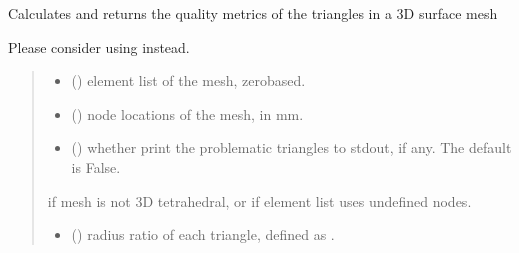 \documentclass[letterpaper,10pt,english]{sphinxmanual}
\begin{document}
\begin{fulllineitems}
\label{\detokenize{_autosummary/nirfasterff.meshing.meshutils.checkmesh3d_surface:nirfasterff.meshing.meshutils.checkmesh3d_surface}}
\pysigstartsignatures
{}
\pysigstopsignatures
\sphinxAtStartPar
Calculates and returns the quality metrics of the triangles in a 3D surface mesh

\sphinxAtStartPar
Please consider using  instead.
\begin{quote}\begin{description}
\begin{itemize}
\item {} 
\sphinxAtStartPar
{} () \textendash{} element list of the mesh, zero\sphinxhyphen{}based.

\item {} 
\sphinxAtStartPar
{} () \textendash{} node locations of the mesh, in mm.

\item {} 
\sphinxAtStartPar
{} (\sphinxstyleliteralemphasis{\sphinxupquote{, }}) \textendash{} whether print the problematic triangles to stdout, if any. The default is False.

\end{itemize}

\sphinxAtStartPar
{} \textendash{} if mesh is not 3D tetrahedral, or if element list uses undefined nodes.

\sphinxAtStartPar
\begin{itemize}
\item {} 
\sphinxAtStartPar
{} () \textendash{} radius ratio of each triangle, defined as .


\end{itemize}
\end{description}
\end{quote}
\end{fulllineitems}
\end{document}

